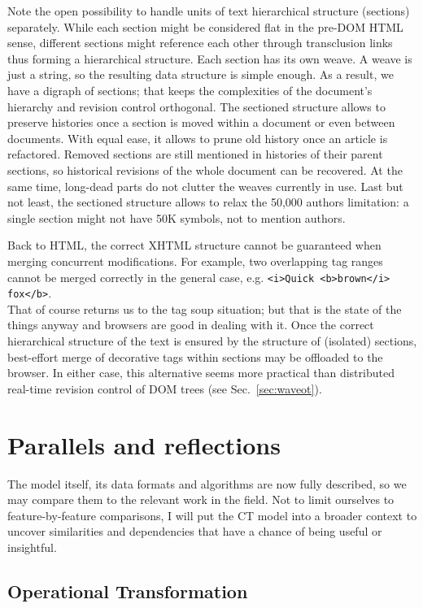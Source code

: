 \documentclass{sig-alternate}
\begin{document}
Note the open possibility to handle units of text hierarchical structure (sections) separately.
While each section might be considered flat in the pre-DOM HTML sense, different sections might reference each other through transclusion links thus forming a hierarchical structure.
Each section has its own weave. A weave is just a string, so the resulting data structure is simple enough.
As a result, we have a digraph of sections; that keeps the complexities of the document's hierarchy and revision control orthogonal. 
The sectioned structure allows to preserve histories once a section is moved within a document or even between documents.
With equal ease, it allows to prune old history once an article is refactored.
Removed sections are still mentioned in histories of their parent sections, so historical revisions of the whole document can be recovered. At the same time, long-dead parts do not clutter the weaves currently in use.
Last but not least, the sectioned structure allows to relax the 50,000 authors limitation: a single section might not have 50K symbols, not to mention authors.

Back to HTML, the correct XHTML structure cannot be guaranteed when merging concurrent modifications. For example, two overlapping tag ranges cannot be merged correctly in the general case, e.g. 
{\small \verb+<i>Quick <b>brown</i> fox</b>+. }\\
That of course returns us to the tag soup situation; but that is the state of the things anyway and  browsers are good in dealing with it. 
Once the correct hierarchical structure of the text is ensured by the structure of (isolated) sections, best-effort merge of decorative tags within sections may be offloaded to the browser.
In either case, this alternative seems more practical than distributed real-time revision control of DOM trees (see Sec.~\ref{sec:waveot}).


\section{Parallels and reflections} \label{sec:reflections}

The model itself, its data formats and algorithms are now fully described, so we may compare them to the relevant work in the field.
Not to limit ourselves to feature-by-feature comparisons, I will put the CT model into a broader context to uncover similarities and dependencies that have a chance of being useful or insightful.

\subsection{Operational Transformation} \label{sec:ot}
\end{document}
